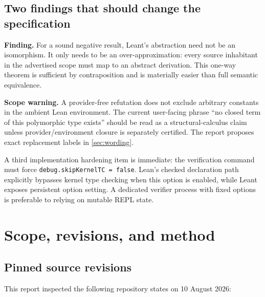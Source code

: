 \documentclass[11pt,letterpaper,openany]{report}
\theoremstyle{definition}
\theoremstyle{remark}
\newcommand{\code}[1]{\texttt{#1}}
\newcommand{\warningbox}[1]{\par\medskip\noindent\colorbox{AmberLight}{\parbox{\dimexpr\linewidth-2\fboxsep\relax}{\textbf{Scope warning.} #1}}\par\medskip}
\newcommand{\findingbox}[1]{\par\medskip\noindent\colorbox{GreenLight}{\parbox{\dimexpr\linewidth-2\fboxsep\relax}{\textbf{Finding.} #1}}\par\medskip}
\begin{document}
\section{Two findings that should change the specification}

\findingbox{For a sound negative result, Leant's abstraction need not be an isomorphism. It only needs to be an over-approximation: every source inhabitant in the advertised scope must map to an abstract derivation. This one-way theorem is sufficient by contraposition and is materially easier than full semantic equivalence.}

\warningbox{A provider-free refutation does not exclude arbitrary constants in the ambient Lean environment. The current user-facing phrase ``no closed term of this polymorphic type exists'' should be read as a structural-calculus claim unless provider/environment closure is separately certified. The report proposes exact replacement labels in \cref{sec:wording}.}

A third implementation hardening item is immediate: the verification command must force \code{debug.skipKernelTC = false}. Lean's checked declaration path explicitly bypasses kernel type checking when this option is enabled, while Leant exposes persistent option setting. A dedicated verifier process with fixed options is preferable to relying on mutable REPL state.

\chapter{Scope, revisions, and method}
\label{sec:scope}

\section{Pinned source revisions}

This report inspected the following repository states on 10 August 2026:
\end{document}

